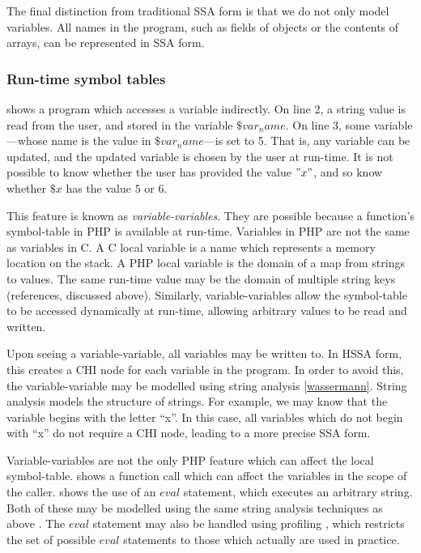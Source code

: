 The final distinction from traditional SSA form is that we do not only model variables.
All names in the program, such as fields of objects or the contents of arrays, can be represented in SSA form.


\subsubsection{Run-time symbol tables}


 shows a program which accesses a variable indirectly.
On line 2, a string value is read from the user, and stored in the variable $\$var_name$.
On line 3, some variable---whose name is the value in $\$var_name$---is set to 5.
That is, any variable can be updated, and the updated variable is chosen by the user at run-time.
It is not possible to know whether the user has provided the value $"x"$, and so know whether $\$x$ has the value $5$ or $6$.

This feature is known as \textit{variable-variables}.
They are possible because a function's symbol-table in PHP is available at run-time.
Variables in PHP are not the same as variables in C.
A C local variable is a name which represents a memory location on the stack.
A PHP local variable is the domain of a map from strings to values.
The same run-time value may be the domain of multiple string keys (references, discussed above).
Similarly, variable-variables allow the symbol-table to be accessed dynamically at run-time, allowing arbitrary values to be read and written.

Upon seeing a variable-variable, all variables may be written to.
In HSSA form, this creates a CHI node for each variable in the program.
In order to avoid this, the variable-variable may be modelled using string analysis \ref{wassermann}.
String analysis models the structure of strings.
For example, we may know that the variable begins with the letter ``x''.
In this case, all variables which do not begin with ``x'' do not require a CHI node, leading to a more precise SSA form.

Variable-variables are not the only PHP feature which can affect the local symbol-table.
 shows a function call which can affect the variables in the scope of the caller.
 shows the use of an $eval$ statement, which executes an arbitrary string.
Both of these may be modelled using the same string analysis techniques as above \cite{wassermann}.
The $eval$ statement may also be handled using profiling \cite{furr}, which restricts the set of possible $eval$ statements to those which actually are used in practice.









